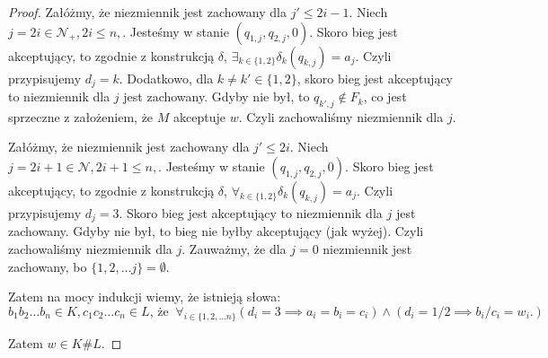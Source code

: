 \documentclass{article}
\theoremstyle{definition}
\theoremstyle{remark}
\begin{document}
\begin{proof}
    Załóżmy, że niezmiennik jest zachowany dla \(j' \leq 2i-1\). Niech \(j=2i \in \mathcal{N}_+, 2i \leq n,\). Jesteśmy w stanie \( \left(q_{1,j}, q_{2,j}, 0 \right) \).
    Skoro bieg jest akceptujący, to zgodnie z konstrukcją \(\delta\), \( \exists _{k \in \{1,2\}} \delta_k(q_{k,j}) = a_j \). Czyli przypisujemy \(d_j = k\).
    Dodatkowo, dla \(k \neq k' \in \{ 1, 2 \} \), skoro bieg jest akceptujący to niezmiennik dla \(j\) jest zachowany. Gdyby nie był, to
    \(q_{k',j} \notin F_k\), co jest sprzeczne z założeniem, że \(M\) akceptuje \(w\). Czyli zachowaliśmy niezmiennik dla \(j\).

    Załóżmy, że niezmiennik jest zachowany dla \(j' \leq 2i\). Niech \(j=2i+1 \in \mathcal{N}, 2i+1 \leq n,\). Jesteśmy w stanie \( \left(q_{1,j}, q_{2,j}, 0 \right) \).
    Skoro bieg jest akceptujący, to zgodnie z konstrukcją \(\delta\), \( \forall _{k \in \{1,2\}} \delta_k(q_{k,j}) = a_j \). Czyli przypisujemy \(d_j = 3\).
    Skoro bieg jest akceptujący to niezmiennik dla \(j\) jest zachowany. Gdyby nie był, to bieg nie byłby akceptujący (jak wyżej). Czyli zachowaliśmy niezmiennik dla \(j\).
    Zauważmy, że dla \(j = 0\) niezmiennik jest zachowany, bo \(\{1, 2, \ldots j\} = \emptyset\).

    Zatem na mocy indukcji wiemy, że istnieją słowa:
    \[ b_1 b_2 \ldots b_n \in K, c_1 c_2 \ldots c_n \in L \text{, że } \ \forall_{i \in \{1,2,\ldots n\}} \left( d_i = 3 \implies a_i = b_i = c_i \right) \land \left( d_i = 1/2 \implies b_i/c_i = w_i. \right) \]

    Zatem \(w \in K \# L\).

\end{proof}
\end{document}
